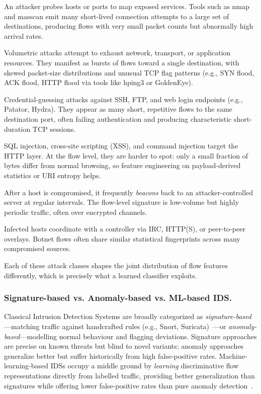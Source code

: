 \begin{description}[leftmargin=1.2em,itemsep=2pt,topsep=2pt]
    \item[Reconnaissance (Port Scan / Network Scan).] An attacker probes hosts or ports to map exposed services. Tools such as \textsf{nmap} and \textsf{masscan} emit many short-lived connection attempts to a large set of destinations, producing flows with very small packet counts but abnormally high arrival rates.
    \item[Denial-of-Service / Distributed Denial-of-Service (DoS/DDoS).] Volumetric attacks attempt to exhaust network, transport, or application resources. They manifest as bursts of flows toward a single destination, with skewed packet-size distributions and unusual TCP flag patterns (e.g., SYN flood, ACK flood, HTTP flood via tools like \textsf{hping3} or \textsf{GoldenEye}).
    \item[Brute-Force.] Credential-guessing attacks against SSH, FTP, and web login endpoints (e.g., \textsf{Patator}, \textsf{Hydra}). They appear as many short, repetitive flows to the same destination port, often failing authentication and producing characteristic short-duration TCP sessions.
    \item[Web Attacks.] SQL injection, cross-site scripting (XSS), and command injection target the HTTP layer. At the flow level, they are harder to spot: only a small fraction of bytes differ from normal browsing, so feature engineering on payload-derived statistics or URI entropy helps.
    \item[Infiltration and Malware Command-and-Control (C2).] After a host is compromised, it frequently \emph{beacons} back to an attacker-controlled server at regular intervals. The flow-level signature is low-volume but highly periodic traffic, often over encrypted channels.
    \item[Botnet Traffic.] Infected hosts coordinate with a controller via IRC, HTTP(S), or peer-to-peer overlays. Botnet flows often share similar statistical fingerprints across many compromised sources.
\end{description}

Each of these attack classes shapes the joint distribution of flow features differently, which is precisely what a learned classifier exploits.

\subsubsection*{Signature-based vs. Anomaly-based vs. ML-based IDS.}
Classical Intrusion Detection Systems are broadly categorized as \emph{signature-based}---matching traffic against handcrafted rules (e.g., Snort, Suricata)~\cite{ref_snort}---or \emph{anomaly-based}---modelling normal behaviour and flagging deviations. Signature approaches are precise on known threats but blind to novel variants; anomaly approaches generalize better but suffer historically from high false-positive rates. Machine-learning-based IDSs occupy a middle ground by \emph{learning} discriminative flow representations directly from labelled traffic, providing better generalization than signatures while offering lower false-positive rates than pure anomaly detection~\cite{ref_anomaly_survey}.
